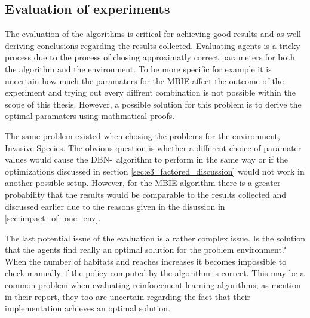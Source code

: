 \subsection{Evaluation of experiments }
The evaluation of the algorithms is critical for achieving good results and as well deriving conclusions regarding the results collected. Evaluating agents is a tricky process due to the process of chosing approximatly correct parameters for both the algorithm and the environment. To be more specific for example it is uncertain how much the paramaters for the MBIE affect the outcome of the experiment and trying out every diffrent combination is not possible within the scope of this thesis. However, a possible solution for this problem is to derive the optimal paramaters using mathmatical proofs.

The same problem existed when chosing the problems for the environment, Invasive Species. The obvious question is whether a different choice of paramater values would cause the DBN-\etre\ algorithm to perform in the same way or if the optimizations discussed in section \ref{sec:e3_factored_discussion} would not work in another possible setup. However, for the MBIE algorithm there is a greater probability that the results would be comparable to the results collected and discussed earlier due to the reasons given in the disussion in \ref{sec:impact_of_one_env}.

The last potential issue of the evaluation is a rather complex issue. Is the solution that the agents find really an optimal solution for the problem environment? When the number of habitats and reaches increases it becomes impossible to check manually if the policy computed by the algorithm is correct. This may be a common problem when evaluating reinforcement learning algorithms; as \textcite{dietterich2013pac} mention in their report, they too are uncertain regarding the fact that their implementation achieves an optimal solution. 
